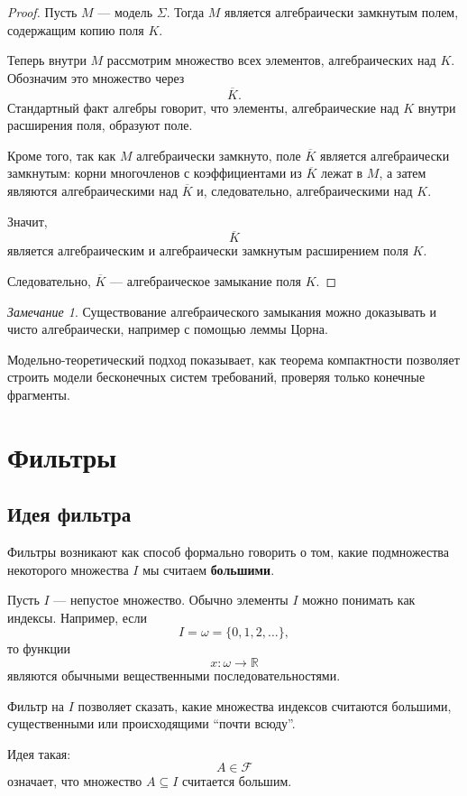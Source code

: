 \documentclass[12pt,a4paper,oneside,openany]{book}
\theoremstyle{definition}
\theoremstyle{plain}
\theoremstyle{remark}
\newtheorem{remark}{Замечание}[chapter]
\begin{document}
\begin{proof}
Пусть $M$ — модель $\Sigma$. Тогда $M$ является алгебраически замкнутым полем, содержащим копию поля $K$.

Теперь внутри $M$ рассмотрим множество всех элементов, алгебраических над $K$. Обозначим это множество через
\[
\overline K.
\]
Стандартный факт алгебры говорит, что элементы, алгебраические над $K$ внутри расширения поля, образуют поле.

Кроме того, так как $M$ алгебраически замкнуто, поле $\overline K$ является алгебраически замкнутым: корни многочленов с коэффициентами из $\overline K$ лежат в $M$, а затем являются алгебраическими над $\overline K$ и, следовательно, алгебраическими над $K$.

Значит,
\[
\overline K
\]
является алгебраическим и алгебраически замкнутым расширением поля $K$.

Следовательно, $\overline K$ — алгебраическое замыкание поля $K$.
\end{proof}

\begin{remark}
Существование алгебраического замыкания можно доказывать и чисто алгебраически, например с помощью леммы Цорна.

Модельно-теоретический подход показывает, как теорема компактности позволяет строить модели бесконечных систем требований, проверяя только конечные фрагменты.
\end{remark}


\section{Фильтры}

\subsection{Идея фильтра}

Фильтры возникают как способ формально говорить о том, какие подмножества некоторого множества $I$ мы считаем \textbf{большими}.

Пусть $I$ — непустое множество. Обычно элементы $I$ можно понимать как индексы. Например, если
\[
I=\omega=\{0,1,2,\ldots\},
\]
то функции
\[
x:\omega\to\mathbb R
\]
являются обычными вещественными последовательностями.

Фильтр на $I$ позволяет сказать, какие множества индексов считаются большими, существенными или происходящими ``почти всюду''.

Идея такая:
\[
A\in\mathcal F
\]
означает, что множество $A\subseteq I$ считается большим.
\end{document}
